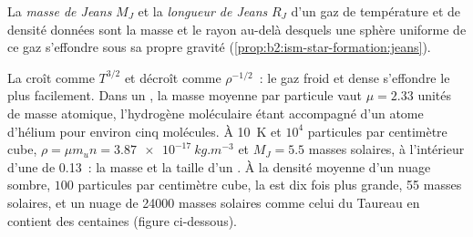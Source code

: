 \begin{definition}\label{def:b2:ism-star-formation:jeans}
La \emph{masse de Jeans} $M_J$ et la \emph{longueur
de Jeans} $R_J$ d'un gaz de température et de densité données sont la masse et le rayon au-delà desquels une sphère uniforme de ce
gaz s'effondre sous sa propre gravité
(\cref{prop:b2:ism-star-formation:jeans}).
\end{definition}

La  croît comme $T^{3/2}$ et décroît comme $\rho^{-1/2}$~: le gaz froid et
dense s'effondre le plus facilement. Dans un , la masse moyenne par particule vaut $\mu = 2.33$ unités de masse atomique, l'hydrogène moléculaire étant accompagné
d'un atome d'hélium pour environ cinq molécules. À \qty{10}{K} et $10^4$ particules par centimètre cube, $\rho = \mu m_u n = \qty{3.87e-17}{kg.m^{-3}}$ et $M_J = 5.5$ masses solaires, à l'intérieur d'une  de \qty{0.13}{\parsec}~: la masse et la taille
d'un . À la densité moyenne d'un nuage sombre, $100$ particules par centimètre cube, la  est dix fois plus grande, 55 masses solaires, et un nuage de \num{24000} masses solaires comme celui du Taureau
en
contient
des
centaines
(figure
ci-dessous).


